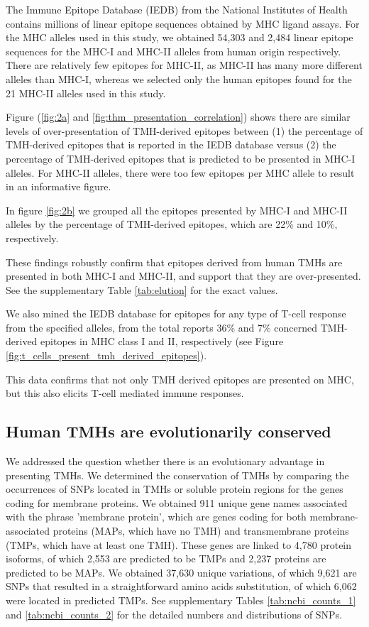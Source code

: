 The Immune Epitope Database (IEDB) from the National Institutes of Health contains millions of linear epitope sequences obtained
by MHC ligand assays.
For the MHC alleles used in this study, 
we obtained 54,303 and 2,484 linear epitope sequences for the MHC-I
and MHC-II alleles from human origin respectively.
There are relatively few epitopes for MHC-II, 
as MHC-II has many more different alleles than MHC-I,
whereas we selected only the human epitopes found for the 21 MHC-II alleles used in this study.

Figure (\ref{fig:2a} and \ref{fig:thm_presentation_correlation}) shows there are similar levels of
over-presentation of TMH-derived epitopes between (1) the
percentage of TMH-derived epitopes that is reported in the IEDB database
versus (2) the percentage of TMH-derived epitopes that is predicted to be presented
in MHC-I alleles.
For MHC-II alleles, there were too few epitopes per MHC allele
to result in an informative figure. 

In figure \ref{fig:2b} we grouped all the epitopes 
presented by MHC-I and MHC-II alleles 
by the percentage of TMH-derived epitopes,
which are 22\% and 10\%, respectively.

These findings robustly confirm that
epitopes derived from human TMHs are presented in both MHC-I and MHC-II, and support that they are over-presented.
See the supplementary Table \ref{tab:elution} for the exact values.

We also mined the IEDB database for epitopes for
any type of T-cell response from the specified
alleles, from the total reports 36\% and 7\% 
concerned TMH-derived epitopes in MHC class I and II, respectively 
(see Figure \ref{fig:t_cells_present_tmh_derived_epitopes}). 

This data confirms that not only TMH derived epitopes are presented on MHC, 
but this also elicits T-cell mediated immune responses.

\subsection{Human TMHs are evolutionarily conserved}


We addressed the question whether there is an evolutionary advantage in presenting TMHs.
We determined the conservation of TMHs 
by comparing the occurrences of SNPs located in TMHs or soluble protein regions 
for the genes coding for membrane proteins.
We obtained 911 unique gene names associated with the phrase 'membrane protein',
which are genes coding for both membrane-associated proteins (MAPs, which have no TMH) and 
transmembrane proteins (TMPs, which have at least one TMH).
These genes are linked to 4,780 protein isoforms, 
of which 2,553 are predicted to be TMPs and 
2,237 proteins are predicted to be MAPs.
We obtained 37,630 unique variations, 
of which 9,621 are SNPs that resulted in a straightforward amino acids substitution, 
of which 6,062 were located in predicted TMPs.
See supplementary Tables \ref{tab:ncbi_counts_1} and \ref{tab:ncbi_counts_2} 
for the detailed numbers and distributions of SNPs.

